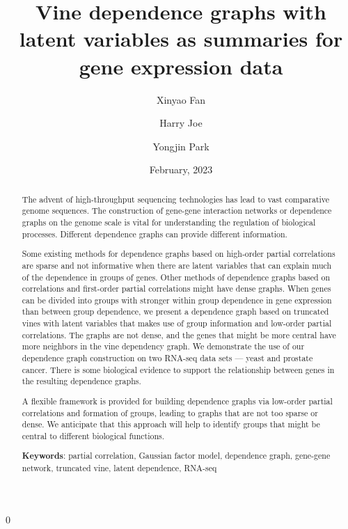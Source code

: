 \documentclass[a4paper]{article}
\renewcommand{\baselinestretch}{1.2}
\newcommand{\blind}{0}
\begin{document}
\def\spacingset#1{\renewcommand{\baselinestretch}%
{#1}\small\normalsize} \spacingset{1}


\spacingset{1.45} %

\date{February, 2023}

\blind
{
  \title{\bf Vine dependence graphs with latent variables as summaries for gene expression data}
  \author[1]{Xinyao Fan}
\author[1]{Harry Joe}
\author[1]{Yongjin Park}


  \maketitle
} \fi




\begin{abstract}
The advent of high-throughput sequencing technologies has
lead to vast comparative genome sequences. The construction of gene-gene
interaction networks or dependence graphs on the genome scale is vital
for understanding the regulation of biological processes.  Different
dependence graphs can provide different information.

Some existing methods for dependence graphs based on high-order
partial correlations are sparse and not informative when there are
latent variables that can explain much of the dependence in groups of
genes. Other methods of dependence graphs based on correlations and
first-order partial correlations might have dense graphs.  When genes
can be divided into groups with stronger within group dependence in
gene expression than between group dependence, we present a dependence
graph based on truncated vines with latent variables that makes use of
group information and low-order partial correlations. The graphs are not dense, and the genes that might be more central have
more neighbors in the vine dependency graph.  We demonstrate the use of
our dependence graph construction on two RNA-seq data sets --- yeast
and prostate cancer. There is some biological evidence to support the
relationship between genes in the resulting dependence graphs.

A flexible framework is provided for building dependence graphs 
via low-order partial correlations and formation of groups, leading
to graphs that are not too sparse or dense.  We anticipate that this
approach will help to identify groups that might be central to different
biological functions.

\textbf{Keywords}: {partial correlation}, {Gaussian factor model}, {dependence graph}, {gene-gene network}, {truncated vine}, {latent dependence}, {RNA-seq}
\end{abstract}
\end{document}
